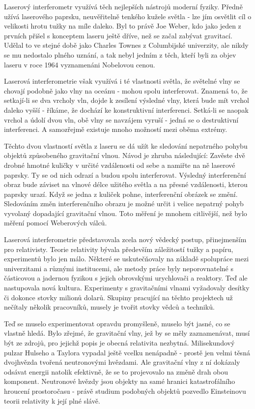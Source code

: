   Laserový interferometr využívá těch nejlepších nástrojů moderní fyziky. Předně užívá laserového
  paprsku, neuvěřitelně tenkého kužele světla - lze jím osvětlit cíl o velikosti hrotu tužky na míle
  daleko. Byl to právě Joe Weber, kdo jako jeden z prvních přišel s konceptem laseru ještě dříve,
  než se začal zabývat gravitací. Udělal to ve stejné době jako Charles Townes z Columbijské
  univerzity, ale nikdy se mu nedostalo plného uznání, a tak nebyl jedním z těch, kteří byli za
  objev laseru v roce 1964 vyznamenáni Nobelovou cenou. 

  Laserová interferometrie však využívá i té vlastnosti světla, že světelné vlny se chovají podobně
  jako vlny na oceánu - mohou spolu interferovat. Znamená to, že setkají-li se dva vrcholy vln,
  dojde k zesílení výsledné vlny, která bude mít vrchol daleko vyšší - říkáme, že dochází ke
  konstruktivní interferenci. Setká-li se naopak vrchol a údolí dvou vln, obě vlny se navzájem
  vyruší - jedná se o destruktivní interferenci. A samozřejmě existuje mnoho možností mezi oběma
  extrémy. 

  Těchto dvou vlastností světla z laseru se dá užít ke sledování nepatrného pohybu objektů
  způsobeného gravitační vlnou. Návod je zhruba následující: Zavěste dvě drobné hmotné kuličky v
  určité vzdálenosti od sebe a namiřte na ně laserové paprsky. Ty se od nich odrazí a budou spolu
  interferovat. Výsledný interferenční obraz bude záviset na vlnové délce užitého světla a na přesné
  vzdálenosti, kterou paprsky urazí. Když se jedna z kuliček pohne, interferenční obrázek se změní.
  Sledováním změn interferenčního obrazu je možné určit i velice nepatrný pohyb vyvolaný dopadající
  gravitační vlnou. Toto měření je mnohem citlivější, než bylo měření pomocí Weberových válců. 

  Laserová interferometrie představovala zcela nový vědecký postup, přinejmenším pro relativisty.
  Teorie relativity bývala především záležitostí tužky a papíru, experimentů bylo jen málo. Některé
  se uskutečňovaly na základě spolupráce mezi univerzitami a různými institucemi, ale metody práce
  byly neporovnatelné s částicovou a jadernou fyzikou s jejich obrovskými urychlovači a reaktory.
  Teď ale nastupovala nová kultura. Experimenty s gravitačními vlnami vyžadovaly desítky či dokonce
  stovky milionů dolarů. Skupiny pracující na těchto projektech už nečítaly několik pracovníků,
  musely je tvořit stovky vědců a techniků. 

  Teď se muselo experimentovat opravdu promyšleně, muselo být jasné, co se vlastně hledá. Bylo
  zřejmé, že gravitační vlny, jež by se měly zaznamenávat, musí být ze zdrojů, pro jejichž popis je
  obecná relativita nezbytná. Milisekundový pulzar Hulseho a Taylora vypadal ještě vcelku nenápadně
  - prostě jen velmi těsná dvojhvězda tvořená neutronovými hvězdami. Ale gravitační vlny z ní
  dokázaly odsávat energii natolik efektivně, že se to projevovalo na změně drah obou komponent.
  Neutronové hvězdy jsou objekty na samé hranici katastrofálního hroucení prostoročasu - právě
  studium podobných objektů pozvedlo Einsteinovu teorii relativity k její plné slávě.

